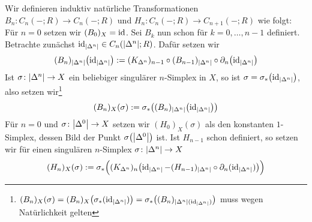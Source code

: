 \begin{definitionUnshaded}[{name=[{Zerteilungsoperatoren}]}]
	Wir definieren induktiv natürliche Transformationen $B_n \colon C_n(-;R) \to C_n(-;R)$ und $H_n \colon C_n(-;R) \to C_{n+1}(-;R)$ wie folgt: 
	Für $n=0$ setzen wir $(B_0)_X = \id$. Sei $B_k$ nun schon für $k=0, \ldots ,n-1$ definiert. 
	Betrachte zunächst $\id_{\abs*{\Delta^n}} \in C_n \enbrace*{\abs*{\Delta^n};R}$. Dafür setzen wir 
	\[
		(B_n)_{\abs*{\Delta^n}} \enbrace*{\id_{\abs*{\Delta^n}}} :=  (K_{\Delta^n})_{n-1} \circ (B_{n-1})_{\abs*{\Delta^n}}\circ \partial_n \enbrace*{\id_{\abs*{\Delta^n}}} 
	\]
	Ist $\sigma \colon \abs*{\Delta^n} \to X$ ein beliebiger singulärer $n$-Simplex in $X$, so ist $\sigma = \sigma_*\enbrace*{\id_{\abs*{\Delta^n}}}$, also setzen wir\footnote{$(B_n)_X(\sigma) = (B_n)_X\enbrace*{\sigma_*(\id_{\abs*{\Delta^n}})}= \sigma_*\enbrace[\big]{(B_n)_{\abs*{\Delta^n}(\id_{\abs*{\Delta^n}})}}$ muss wegen Natürlichkeit gelten}
	\[
		(B_n)_X(\sigma) := \sigma_* \enbrace*{ (B_n)_{\abs*{\Delta^n}} \enbrace*{\id_{\abs*{\Delta^n}}}} 
	\]
	Für $n=0$ und $\sigma \colon\abs*{\Delta^0} \to X$ setzen wir $(H_0)_X(\sigma)$ als den konstanten $1$-Simplex, dessen Bild der Punkt $\sigma\enbrace*{\abs*{\Delta^0}}$ ist.
	Ist $H_{n-1}$ schon definiert, so setzen wir für einen singulären $n$-Simplex $\sigma \colon \abs*{\Delta^n} \to X$
	\[
		(H_n)_X(\sigma) := \sigma_* \enbrace[\Big]{ (K_{\Delta^n})_n \enbrace[\big]{ \id_{\abs*{\Delta^n}} - (H_{n-1})_{\abs*{\Delta^n}}\circ\partial_n 
		\enbrace{\id_{\abs*{\Delta^n}}}}} 
	\]
\end{definitionUnshaded}


